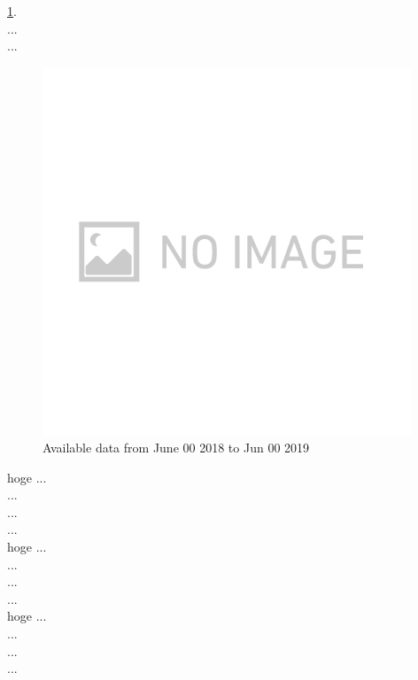 \ref{img:img317}.\\
...\\
...\\
\begin{figure}[H]
  \begin{center}   
    \includegraphics[width=11.0cm]{./img_chap3/img317.png}
    \caption{Available data from June 00 2018 to Jun 00 2019}\label{img:img317}
  \end{center}
\end{figure}

hoge
...\\
...\\
...\\
...\\

hoge
...\\
...\\
...\\
...\\

hoge
...\\
...\\
...\\
...\\

